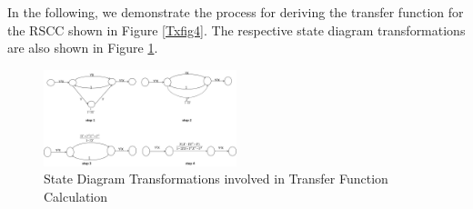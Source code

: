In the following, we demonstrate the process for deriving the transfer function for the RSCC shown in Figure {\ref{Txfig4}}. The respective state diagram transformations are also shown in Figure {\ref{Txfig5}}.

\begin{figure}[h!]
\centering
		\includegraphics[width=0.5\textwidth]{tfexample.png}
		\caption{State Diagram Transformations involved in Transfer Function Calculation }
		\label{Txfig5}
		\end{figure}

